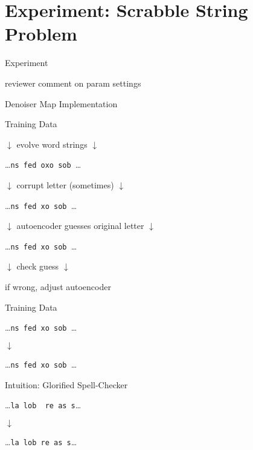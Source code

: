 \section{Experiment: Scrabble String Problem}

\begin{frame}{Experiment}

reviewer comment on param settings

\end{frame}

\begin{frame}{Denoiser Map Implementation}



\end{frame}

\begin{frame}{Training Data}


\centering \Large

$\downarrow$ evolve word strings $\downarrow$

\dots\texttt{ns fed oxo sob }\dots

$\downarrow$ corrupt letter (sometimes) $\downarrow$

\dots\texttt{ns fed xo sob }\dots

$\downarrow$ autoencoder guesses original letter $\downarrow$

\dots\texttt{ns fed xo sob }\dots

$\downarrow$ check guess $\downarrow$

if wrong, adjust autoencoder

\end{frame}

\begin{frame}{Training Data}


\centering \Huge

\dots\texttt{ns fed xo sob }\dots

$\downarrow$

\dots\texttt{ns fed xo sob }\dots

\end{frame}




\begin{frame}{Intuition: Glorified Spell-Checker}

\centering \Huge

\dots\texttt{la lob ~re as s}\dots

$\downarrow$

\dots\texttt{la lob re as s}\dots

\end{frame}

